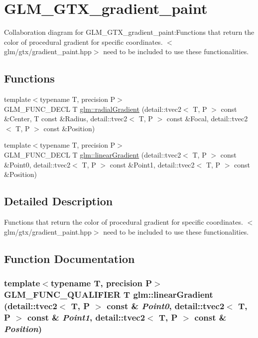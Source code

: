 \hypertarget{group__gtx__gradient__paint}{
\section{GLM\_\-GTX\_\-gradient\_\-paint}
\label{group__gtx__gradient__paint}
}


Collaboration diagram for GLM\_\-GTX\_\-gradient\_\-paint:Functions that return the color of procedural gradient for specific coordinates. $<$glm/gtx/gradient\_\-paint.hpp$>$ need to be included to use these functionalities.  
\subsection*{Functions}
\begin{CompactItemize}
\item 
{\footnotesize template$<$typename T, precision P$>$ }\\GLM\_\-FUNC\_\-DECL T \hyperlink{group__gtx__gradient__paint_g5e9373dad017d6547ce8db966d02394e}{glm::radialGradient} (detail::tvec2$<$ T, P $>$ const \&Center, T const \&Radius, detail::tvec2$<$ T, P $>$ const \&Focal, detail::tvec2$<$ T, P $>$ const \&Position)
\item 
{\footnotesize template$<$typename T, precision P$>$ }\\GLM\_\-FUNC\_\-DECL T \hyperlink{group__gtx__gradient__paint_g8d5ca6ccbfcaf23963228eac37543eeb}{glm::linearGradient} (detail::tvec2$<$ T, P $>$ const \&Point0, detail::tvec2$<$ T, P $>$ const \&Point1, detail::tvec2$<$ T, P $>$ const \&Position)
\end{CompactItemize}


\subsection{Detailed Description}
Functions that return the color of procedural gradient for specific coordinates. $<$glm/gtx/gradient\_\-paint.hpp$>$ need to be included to use these functionalities. 



\subsection{Function Documentation}
\hypertarget{group__gtx__gradient__paint_g8d5ca6ccbfcaf23963228eac37543eeb}{
\subsubsection[linearGradient]{\setlength{\rightskip}{0pt plus 5cm}template$<$typename T, precision P$>$ GLM\_\-FUNC\_\-QUALIFIER T glm::linearGradient (detail::tvec2$<$ T, P $>$ const \& {\em Point0}, \/  detail::tvec2$<$ T, P $>$ const \& {\em Point1}, \/  detail::tvec2$<$ T, P $>$ const \& {\em Position})}}
\label{group__gtx__gradient__paint_g8d5ca6ccbfcaf23963228eac37543eeb}


